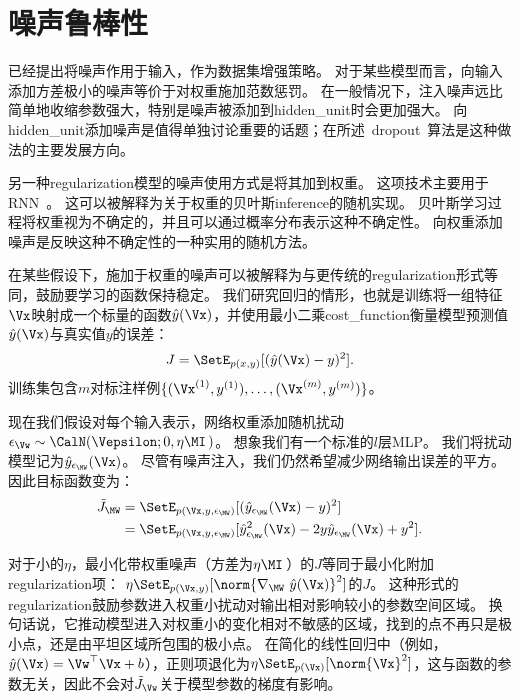 
\section{噪声鲁棒性}
\label{sec:noise_robustness}

已经提出将噪声作用于输入，作为数据集增强策略。
对于某些模型而言，向输入添加方差极小的噪声等价于对权重施加范数惩罚\citep{Bishop1995,bishop95training}。
在一般情况下，注入噪声远比简单地收缩参数强大，特别是噪声被添加到\gls{hidden_unit}时会更加强大。
向\gls{hidden_unit}添加噪声是值得单独讨论重要的话题；在所述~\gls{dropout}~算法是这种做法的主要发展方向。

另一种\gls{regularization}模型的噪声使用方式是将其加到权重。
这项技术主要用于\gls{RNN}~\citep{JimGilesHorne1996,Graves-2011}。
这可以被解释为关于权重的贝叶斯\gls{inference}的随机实现。
贝叶斯学习过程将权重视为不确定的，并且可以通过概率分布表示这种不确定性。
向权重添加噪声是反映这种不确定性的一种实用的随机方法。

在某些假设下，施加于权重的噪声可以被解释为与更传统的\gls{regularization}形式等同，鼓励要学习的函数保持稳定。
我们研究回归的情形，也就是训练将一组特征$\Vx$映射成一个标量的函数$\hat y(\Vx)$，并使用最小二乘\gls{cost_function}衡量模型预测值$\hat y(\Vx)$与真实值$y$的误差：
\begin{align}
 J = \SetE_{p(x,y)}[(\hat y(\Vx) - y)^2].
\end{align}
训练集包含$m$对标注样例$\{(\Vx^{(1)}, y^{(1)}),\dots,(\Vx^{(m)}, y^{(m)})\}$。

现在我们假设对每个输入表示，网络权重添加随机扰动$\epsilon_{\Vw} \sim \CalN(\Vepsilon;0, \eta\MI \, )$。
想象我们有一个标准的$l$层MLP。
我们将扰动模型记为$\hat y_{\epsilon_{\MW}} (\Vx)$。
尽管有噪声注入，我们仍然希望减少网络输出误差的平方。
因此目标函数变为：
\begin{align}
 \tilde J_{\MW} &= \SetE_{p(\Vx,y,\epsilon_{\MW})}[(\hat y_{\epsilon_{\MW}}(\Vx) - y)^2] \\
   &=  \SetE_{p(\Vx,y,\epsilon_{\MW})}[\hat y_{\epsilon_{\MW}}^2(\Vx) -  2y\hat y_{\epsilon_{\MW}}
   (\Vx)+ y^2] .
\end{align}

对于小的$\eta$，最小化带权重噪声（方差为$\eta \MI$\,）的$J$等同于最小化附加\gls{regularization}项：
$ \eta \SetE_{p(\Vx,y)}[\norm{\nabla_{\MW}~\hat y(\Vx)}^2]$的$J$。
这种形式的\gls{regularization}鼓励参数进入权重小扰动对输出相对影响较小的参数空间区域。
换句话说，它推动模型进入对权重小的变化相对不敏感的区域，找到的点不再只是极小点，还是由平坦区域所包围的极小点\citep{Hochreiter95}。
在简化的线性回归中（例如，$\hat y(\Vx) = \Vw^\top \Vx + b$），正则项退化为$ \eta \SetE_{p(\Vx)}[\norm{\Vx}^2]$，这与函数的参数无关，因此不会对$\tilde J_{\Vw}$关于模型参数的梯度有影响。

